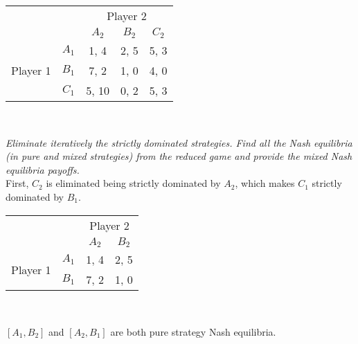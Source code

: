 \documentclass[12pt]{amsart}
\begin{document}
\begin{center}
	\def\arraystretch{1.25}%
	\begin{tabular}{ccccc}
		&                            & \multicolumn{3}{c}{Player 2}                                                         \\
		& \multicolumn{1}{c|}{}      & \multicolumn{1}{c|}{$A_2$} & \multicolumn{1}{c|}{$B_2$} & \multicolumn{1}{c|}{$C_2$} \\ \cline{2-5} 
		& \multicolumn{1}{c|}{$A_1$} & \multicolumn{1}{c|}{1, 4}  & \multicolumn{1}{c|}{2, 5}  & \multicolumn{1}{c|}{5, 3}  \\ \cline{2-5} 
		Player 1 & \multicolumn{1}{c|}{$B_1$} & \multicolumn{1}{c|}{7, 2}  & \multicolumn{1}{c|}{1, 0}  & \multicolumn{1}{c|}{4, 0}  \\ \cline{2-5} 
		& \multicolumn{1}{c|}{$C_1$} & \multicolumn{1}{c|}{5, 10} & \multicolumn{1}{c|}{0, 2}  & \multicolumn{1}{c|}{5, 3}  \\ \cline{2-5} 
	\end{tabular} \\[2ex]
\end{center}

\textit{Eliminate iteratively the strictly dominated strategies. Find all the Nash equilibria (in pure
	and mixed strategies) from the reduced game and provide the mixed Nash equilibria
	payoffs.} \\
	
	First, $C_2$ is eliminated being strictly dominated by $A_2$,
	which makes $C_1$ strictly dominated by $B_1$.

	\begin{center}
		\def\arraystretch{1.25}%
		\begin{tabular}{cccc}
			&                            & \multicolumn{2}{c}{Player 2}                            \\
			& \multicolumn{1}{c|}{}      & \multicolumn{1}{c|}{$A_2$} & \multicolumn{1}{c|}{$B_2$} \\ \cline{2-4} 
			\multirow{2}{*}{Player 1} & \multicolumn{1}{c|}{$A_1$} & \multicolumn{1}{c|}{1, 4}  & \multicolumn{1}{c|}{2, 5}  \\ \cline{2-4} 
			& \multicolumn{1}{c|}{$B_1$} & \multicolumn{1}{c|}{7, 2}  & \multicolumn{1}{c|}{1, 0}  \\ \cline{2-4} 
		\end{tabular} \\[1ex]
	\end{center}
	
	$[A_1,B_2]$ and $[A_2,B_1]$ are both pure strategy Nash equilibria.
	
\end{document}
